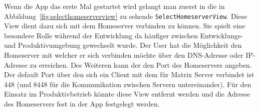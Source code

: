     Wenn die App das erste Mal gestartet wird gelangt man zuerst in die in Abbildung~\ref{fig:selecthomeserverview} zu sehende \texttt{SelectHomeserverView}.
    Diese View dient dazu sich mit dem Homeserver verbinden zu können.
    Sie spielt eine besondere Rolle während der Entwicklung da häufiger zwischen Entwicklungs- und Produktivumgebung gewechselt wurde.
    Der User hat die Möglichkeit den Homeserver mit welcher er sich verbinden möchte über den DNS-Adresse oder IP-Adresse zu erreichen.
    Des Weiteren kann der den Port des Homeservers angeben.
    Der default Port über den sich ein Client mit dem für Matrix Server verbindet ist 448 (und 8448 für die Kommunikation zwischen Servern untereinander).
    Für den Einsatz im Produktivbetrieb könnte diese View entfernt werden und die Adresse des Homeservers fest in der App festgelegt werden.

